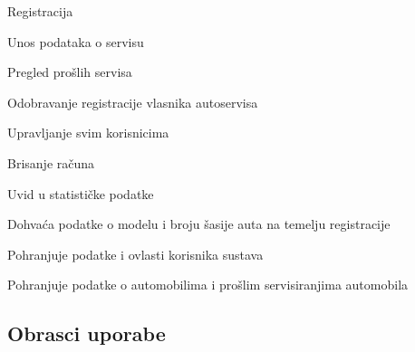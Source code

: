 \begin{packed_enum}
\begin{packed_enum}
					\item Registracija
					\item Unos podataka o servisu
					\item Pregled prošlih servisa
					
				\end{packed_enum}
				
				\item  {}
				
				\begin{packed_enum}
					
					\item Odobravanje registracije vlasnika autoservisa
					\item Upravljanje svim korisnicima
					\item Brisanje računa
					\item Uvid u statističke podatke
					
				\end{packed_enum}
			
				\item  {}
				
				\begin{packed_enum}
					
					\item Dohvaća podatke o modelu i broju šasije auta na temelju registracije
					
				\end{packed_enum}
			
				\item {}
				
				\begin{packed_enum}
					
					\item Pohranjuje podatke i ovlasti korisnika sustava
					\item Pohranjuje podatke o automobilima i prošlim servisiranjima automobila
					
				\end{packed_enum}
				
			\end{packed_enum}
			
			\eject 
			
			
				
			\subsection{Obrasci uporabe}
				
